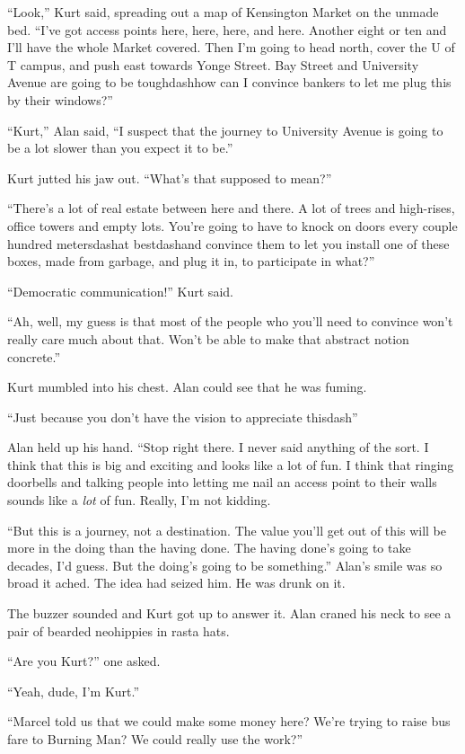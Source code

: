 ``Look,'' Kurt said, spreading out a map of Kensington Market on the
unmade bed.  ``I've got access points here, here, here, and here. 
Another eight or ten and I'll have the whole Market covered.  Then I'm
going to head north, cover the U of T campus, and push east towards
Yonge Street.  Bay Street and University Avenue are going to be
toughdash{}how can I convince bankers to let me plug this by their
windows?''

``Kurt,'' Alan said, ``I suspect that the journey to University Avenue
is going to be a lot slower than you expect it to be.''

Kurt jutted his jaw out.  ``What's that supposed to mean?''

``There's a lot of real estate between here and there.  A lot of trees
and high-rises, office towers and empty lots.  You're going to have to
knock on doors every couple hundred metersdash{}at bestdash{}and convince
them to let you install one of these boxes, made from garbage, and
plug it in, to participate in what?''

``Democratic communication!'' Kurt said.

``Ah, well, my guess is that most of the people who you'll need to
convince won't really care much about that.  Won't be able to make
that abstract notion concrete.''

Kurt mumbled into his chest.  Alan could see that he was fuming.

``Just because you don't have the vision to appreciate thisdash{}''

Alan held up his hand.  ``Stop right there.  I never said anything of
the sort.  I think that this is big and exciting and looks like a lot
of fun.  I think that ringing doorbells and talking people into
letting me nail an access point to their walls sounds like a
\textit{lot} of fun.  Really, I'm not kidding.

``But this is a journey, not a destination.  The value you'll get out
of this will be more in the doing than the having done.  The having
done's going to take decades, I'd guess.  But the doing's going to be
something.'' Alan's smile was so broad it ached.  The idea had seized
him.  He was drunk on it.

The buzzer sounded and Kurt got up to answer it.  Alan craned his neck
to see a pair of bearded neohippies in rasta hats. 

``Are you Kurt?'' one asked.

``Yeah, dude, I'm Kurt.''

``Marcel told us that we could make some money here?  We're trying to
raise bus fare to Burning Man?  We could really use the work?''

